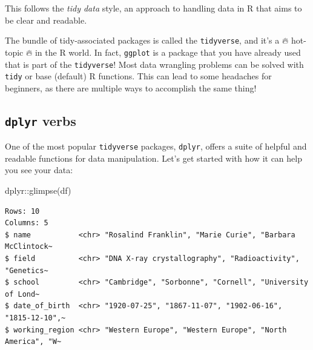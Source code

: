 \documentclass[
  letterpaper,
  DIV=11,
  numbers=noendperiod]{scrreprt}
\newenvironment{Shaded}{\begin{snugshade}}{\end{snugshade}}
\newcommand{\FunctionTok}[1]{\textcolor[rgb]{0.28,0.35,0.67}{#1}}
\newcommand{\NormalTok}[1]{\textcolor[rgb]{0.00,0.23,0.31}{#1}}
\newcommand{\SpecialCharTok}[1]{\textcolor[rgb]{0.37,0.37,0.37}{#1}}
\begin{document}
This follows the \emph{tidy data} style, an approach to handling data in
R that aims to be clear and readable.

\begin{tcolorbox}[enhanced jigsaw, left=2mm, colframe=quarto-callout-note-color-frame, leftrule=.75mm, opacitybacktitle=0.6, toptitle=1mm, title=\textcolor{quarto-callout-note-color}{\faInfo}\hspace{0.5em}{Note}, opacityback=0, coltitle=black, colbacktitle=quarto-callout-note-color!10!white, breakable, colback=white, titlerule=0mm, bottomrule=.15mm, arc=.35mm, bottomtitle=1mm, rightrule=.15mm, toprule=.15mm]

The bundle of tidy-associated packages is called the \texttt{tidyverse},
and it's a 🔥 hot-topic 🔥 in the R world. In fact, \texttt{ggplot} is a
package that you have already used that is part of the
\texttt{tidyverse}! Most data wrangling problems can be solved with
\texttt{tidy} or base (default) R functions. This can lead to some
headaches for beginners, as there are multiple ways to accomplish the
same thing!

\end{tcolorbox}

\hypertarget{dplyr-verbs}{%
\subsection{\texorpdfstring{\texttt{dplyr}
verbs}{dplyr verbs}}\label{dplyr-verbs}}

One of the most popular \texttt{tidyverse} packages, \texttt{dplyr},
offers a suite of helpful and readable functions for data manipulation.
Let's get started with how it can help you see your data:

\begin{Shaded}
\begin{Highlighting}[]
\NormalTok{dplyr}\SpecialCharTok{::}\FunctionTok{glimpse}\NormalTok{(df)}
\end{Highlighting}
\end{Shaded}

\begin{verbatim}
Rows: 10
Columns: 5
$ name           <chr> "Rosalind Franklin", "Marie Curie", "Barbara McClintock~
$ field          <chr> "DNA X-ray crystallography", "Radioactivity", "Genetics~
$ school         <chr> "Cambridge", "Sorbonne", "Cornell", "University of Lond~
$ date_of_birth  <chr> "1920-07-25", "1867-11-07", "1902-06-16", "1815-12-10",~
$ working_region <chr> "Western Europe", "Western Europe", "North America", "W~
\end{verbatim}
\end{document}
